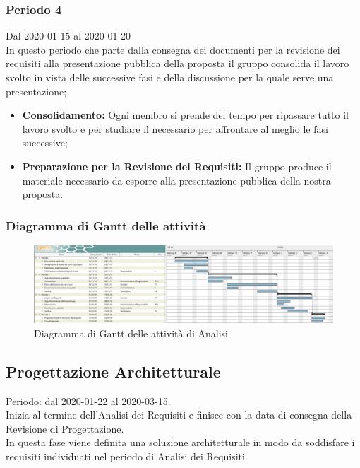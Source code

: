 \subsubsection{Periodo 4} 
Dal 2020-01-15 al 2020-01-20\\
In questo periodo che parte dalla consegna dei documenti per la revisione dei requisiti alla presentazione pubblica della proposta il gruppo consolida il lavoro svolto in vista delle successive fasi e della discussione per la quale serve una presentazione;
\begin{itemize}
	\item \textbf{Consolidamento:} Ogni membro si prende del tempo per ripassare tutto il lavoro svolto e per studiare il necessario per affrontare al meglio le fasi successive;
	\item \textbf{Preparazione per la Revisione dei Requisiti:} Il gruppo produce il materiale necessario da esporre alla presentazione pubblica della nostra proposta.
\end{itemize}

	\newpage
	\begin{landscape}
	\subsubsection{Diagramma di Gantt delle attività}
	\pagestyle{empty}
	\begin{figure}[h]
		
		\begin{center}	
			\includegraphics[scale=0.50]{Sezioni/DiagrammiGantt/Analisi.png}
		\end{center}
	\caption{Diagramma di Gantt delle attività di Analisi}
	\end{figure}
	 \end{landscape}

\clearpage
\subsection{Progettazione Architetturale}
Periodo: dal 2020-01-22 al 2020-03-15.
\\Inizia al termine dell'Analisi dei Requisiti e finisce con la data di consegna della Revisione di Progettazione.
\\In questa fase viene definita una soluzione architetturale in modo da soddisfare i requisiti individuati nel periodo di Analisi dei Requisiti.

